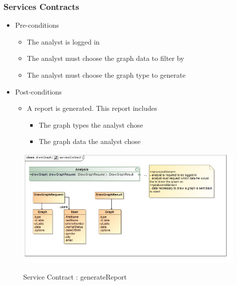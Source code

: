 \documentclass{article}
\begin{document}
		\subsubsection{Services Contracts}
		\begin{itemize}
			\item Pre-conditions
				\begin{itemize}
					\item The analyst is logged in
					\item The analyst must choose the graph data to filter by
					\item The analyst must choose the graph type to generate
				\end{itemize}
			\item Post-conditions
				\begin{itemize}
					\item A report is generated. This report includes
						\begin{itemize}
							\item The graph types the analyst chose
							\item The graph data the analyst chose 
						\end{itemize}
				\end{itemize}
		\end{itemize}
		\begin{figure}[H]
		\includegraphics[width=\textwidth]{images/class__drawGraph__serviceContract.jpg}  \\
		\caption{Service Contract : generateReport}
		\end{figure}

\end{document}

